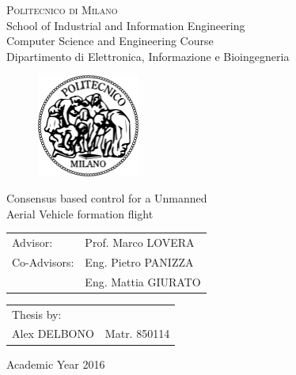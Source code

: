 \begin{titlepage}

\begin{center}
\Large{\textsc{Politecnico di Milano}}\\
\Large{School of Industrial and Information Engineering}\\
\large{Computer Science and Engineering Course}\\
\large{Dipartimento di Elettronica, Informazione e Bioingegneria}
\par
\end{center}

\vspace{0.2cm}

\begin{center}
\begin{figure}[h]
\centering{}
\includegraphics[width=0.3\textwidth]{title-page/logo-polimi}
\end{figure}
\par
\end{center}

\begin{center}
\LARGE{Consensus based control for a Unmanned \\ Aerial Vehicle formation flight}
\vspace{1.0cm}
\par
\end{center}

\begin{flushleft}
\begin{tabular}{ll}
Advisor:  & Prof. Marco LOVERA\tabularnewline
Co-Advisors:  & Eng. Pietro PANIZZA\tabularnewline
              & Eng. Mattia GIURATO\tabularnewline
\end{tabular}\vspace{0.3cm}
\par
\end{flushleft}

\begin{flushright}
\begin{tabular}{ll}
Thesis by: & \tabularnewline
Alex DELBONO & Matr. 850114\tabularnewline
\end{tabular}\vspace{1cm}
\par
\end{flushright}

\begin{center}
{\large{}Academic Year 2016}
\par
\end{center}{\large \par}

\end{titlepage}
